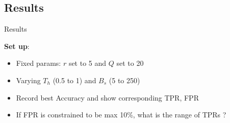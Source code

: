 \subsection{Results}
\begin{frame}{Results}

\centering
\begin{minipage}[t]{0.7\linewidth}
\textbf{Set up}:
    \begin{itemize}
        \item Fixed params: $r$ set to 5 and $Q$ set to 20
        \item Varying $T_h$ (0.5 to 1) and $B_s$ (5 to 250)
        \item Record best Accuracy and show corresponding TPR, FPR
        \item If FPR is constrained to be max 10\%, what is the range of TPRs ?
    \end{itemize}
\end{minipage}

\smallskip


\end{frame}
